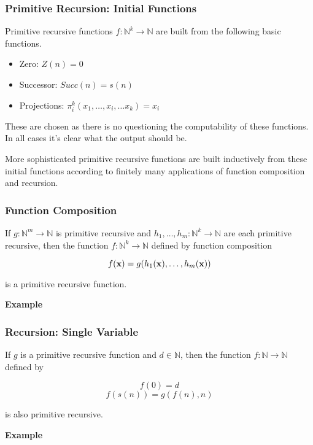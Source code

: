 \documentclass{beamer}
\begin{document}
\begin{frame}
	\frametitle{Primitive Recursion: Initial Functions}

	Primitive recursive functions $f: \mathbb{N}^{k} \rightarrow \mathbb{N}$ are built from the following basic functions. 

	\vspace{0.5cm}

	\begin{itemize}
		\item[] Zero: $Z(n) = 0$
		\item[] Successor: $Succ(n) = s(n)$
		\item[] Projections: $\pi_{i}^{k}(x_{1},\dots, x_{i},\dots x_{k}) = x_{i}$
	\end{itemize}

	\vspace{0.5cm}

	These are chosen as there is no questioning the computability of these functions. In all cases it's clear what the output should be. 

	\vspace{0.5cm}

	More sophisticated primitive recursive functions are built inductively from these initial functions according to finitely many applications of function composition and recursion. 

\end{frame}

\begin{frame}
	\frametitle{Function Composition}

	If $g:\mathbb{N}^{m} \rightarrow \mathbb{N}$ is primitive recursive and $h_{1},\dots, h_{m}: \mathbb{N}^{k} \rightarrow \mathbb{N}$ are each primitive recursive, then the function $f:\mathbb{N}^{k} \rightarrow \mathbb{N}$ defined by function composition 

	$$f({\bf x}) = g(h_{1}({\bf x}),\dots , h_{m}({\bf x}))$$

	is a primitive recursive function. 

	\vspace{0.5cm}

	{\bf Example}
	\vspace{4cm}

\end{frame}

\begin{frame}
	\frametitle{Recursion: Single Variable}

	If $g$ is a primitive recursive function and $d \in \mathbb{N}$, then the function $f:\mathbb{N} \rightarrow \mathbb{N}$ defined by 

	$$f(0) = d$$
	$$f(s(n)) = g(f(n),n)$$

	is also primitive recursive. 

	\vspace{0.5cm}

	{\bf Example}
	\vspace{4cm}

\end{frame}
\end{document}
